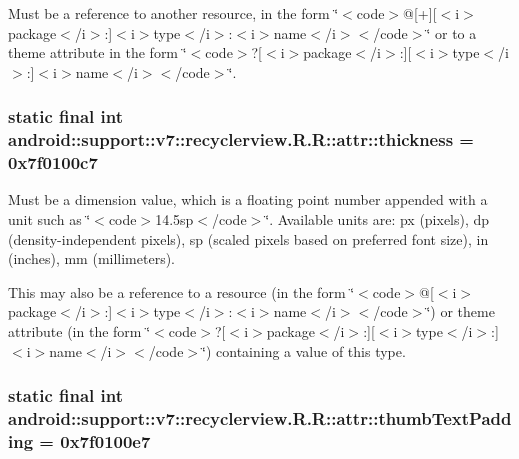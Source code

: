 Must be a reference to another resource, in the form \char`\"{}$<$code$>$@\mbox{[}+\mbox{]}\mbox{[}$<$i$>$package$<$/i$>$:\mbox{]}$<$i$>$type$<$/i$>$:$<$i$>$name$<$/i$>$$<$/code$>$\char`\"{} or to a theme attribute in the form \char`\"{}$<$code$>$?\mbox{[}$<$i$>$package$<$/i$>$:\mbox{]}\mbox{[}$<$i$>$type$<$/i$>$:\mbox{]}$<$i$>$name$<$/i$>$$<$/code$>$\char`\"{}. \hypertarget{classandroid_1_1support_1_1v7_1_1recyclerview_1_1_r_1_1attr_f74f46dd0b3adb89f16dc3b8558a0a46}{
\subsubsection[{thickness}]{\setlength{\rightskip}{0pt plus 5cm}static final int android::support::v7::recyclerview.R.R::attr::thickness = 0x7f0100c7}}
\label{classandroid_1_1support_1_1v7_1_1recyclerview_1_1_r_1_1attr_f74f46dd0b3adb89f16dc3b8558a0a46}


Must be a dimension value, which is a floating point number appended with a unit such as \char`\"{}$<$code$>$14.5sp$<$/code$>$\char`\"{}. Available units are: px (pixels), dp (density-independent pixels), sp (scaled pixels based on preferred font size), in (inches), mm (millimeters). 

This may also be a reference to a resource (in the form \char`\"{}$<$code$>$@\mbox{[}$<$i$>$package$<$/i$>$:\mbox{]}$<$i$>$type$<$/i$>$:$<$i$>$name$<$/i$>$$<$/code$>$\char`\"{}) or theme attribute (in the form \char`\"{}$<$code$>$?\mbox{[}$<$i$>$package$<$/i$>$:\mbox{]}\mbox{[}$<$i$>$type$<$/i$>$:\mbox{]}$<$i$>$name$<$/i$>$$<$/code$>$\char`\"{}) containing a value of this type. \hypertarget{classandroid_1_1support_1_1v7_1_1recyclerview_1_1_r_1_1attr_96fb0d8380a13ca656fe8d48c6fbecfc}{
\subsubsection[{thumbTextPadding}]{\setlength{\rightskip}{0pt plus 5cm}static final int android::support::v7::recyclerview.R.R::attr::thumbTextPadding = 0x7f0100e7}}
\label{classandroid_1_1support_1_1v7_1_1recyclerview_1_1_r_1_1attr_96fb0d8380a13ca656fe8d48c6fbecfc}



